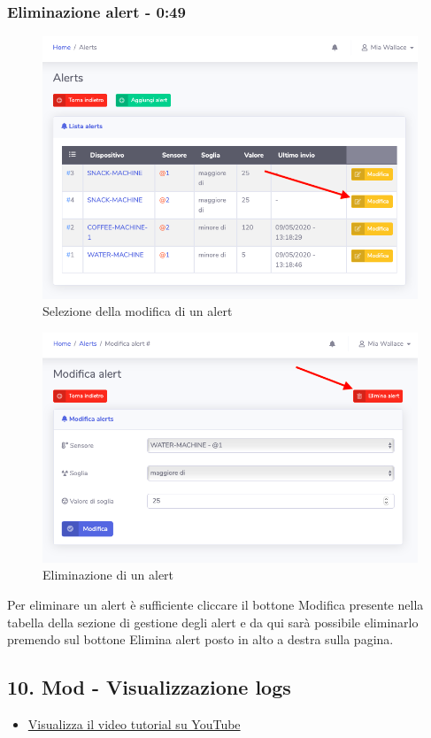 	\subsubsection{Eliminazione alert - 0:49}
	\begin{figure}[H]
		\centering
		\includegraphics[scale=0.600]{res/images/mod/selModAlert.png}
		\caption{Selezione della modifica di un alert}
	\end{figure}
	\begin{figure}[H]
		\centering
		\includegraphics[scale=0.600]{res/images/mod/elimAlert.png}
		\caption{Eliminazione di un alert}
	\end{figure}
		Per eliminare un alert è sufficiente cliccare il bottone Modifica presente nella tabella della sezione di gestione degli alert e da qui sarà possibile eliminarlo premendo sul bottone Elimina alert posto in alto a destra sulla pagina.
	

\newpage \subsection{10. Mod - Visualizzazione logs}
	\begin{itemize}
		\item \href{https://www.youtube.com/watch?v=PjySMOLCtMA&list=PLPKYjnuIh1FA3b3jn_bwY_ztYzaFn2mIT&index=13}{Visualizza il video tutorial su YouTube} 
	\end{itemize}
